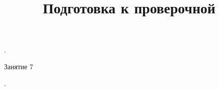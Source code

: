 \begin{homework}[number=3]
	\begin{listofex}
		\item .
	\end{listofex}
\end{homework}

\begin{class}[number=8]
	\title{Подготовка к проверочной}
	\begin{listofex}
		\item Занятие 7
	\end{listofex}
\end{class}

\begin{exam}
	\begin{listofex}
		\item .
	\end{listofex}
\end{exam}
